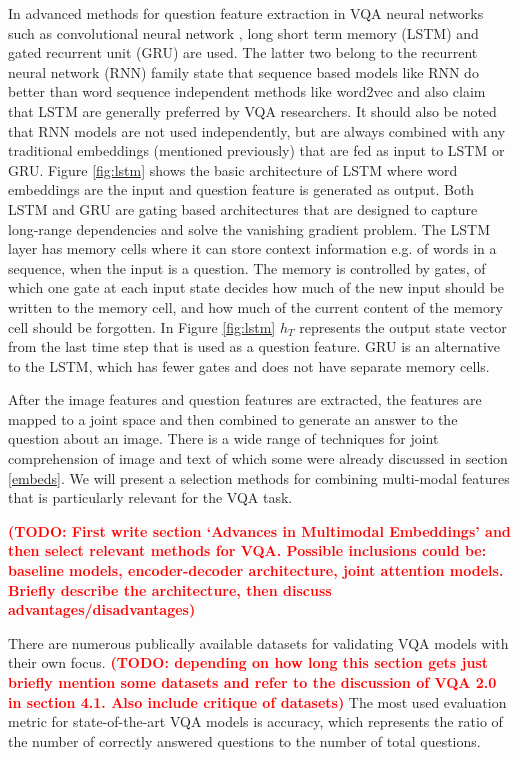 \documentclass{article}
\newcommand{\todo}[1]{\textbf{\textcolor{Red}{(TODO: #1)}}}
\begin{document}
In advanced methods for question feature extraction in VQA neural networks such as convolutional neural network \citep{krizhevsky2012imagenet}, long short term memory (LSTM) \citep{lstm} and gated recurrent unit (GRU) \citep{cho2014gru} are used. The latter two belong to the recurrent neural network (RNN) family \citep{elman1990finding} \cite{young2018recent} state that sequence based models like RNN do better than word sequence independent methods like word2vec and also claim that LSTM are generally preferred by VQA researchers. It should also be noted that RNN models are not used independently, but are always combined with any traditional embeddings (mentioned previously) that are fed as input to LSTM or GRU. Figure \ref{fig:lstm} shows the basic architecture of LSTM where word embeddings are the input and question feature is generated as output. Both LSTM and GRU are gating based architectures that are designed to capture long-range dependencies and solve the vanishing gradient problem. The LSTM layer has memory cells where it can store context information e.g. of words in a sequence, when the input is a question. The memory is controlled by gates, of which one gate at each input state decides how much of the new input should be written to the memory cell, and how much of the current content of the memory cell should be forgotten. In Figure \ref{fig:lstm} $h_T$ represents the output state vector from the last time step that is used as a question feature. GRU is an alternative to the LSTM, which has fewer gates and does not have separate memory cells.

After the image features and question features are extracted, the features are mapped to a joint space and then combined to generate an answer to the question about an image. There is a wide range of techniques for joint comprehension of image and text of which some were already discussed in section \ref{embeds}. We will present a selection methods for combining multi-modal features that is particularly relevant for the VQA task.

\todo{First write section ‘Advances in Multimodal Embeddings’ and then select relevant methods for VQA. Possible inclusions could be: baseline models, encoder-decoder architecture, joint attention models. Briefly describe the architecture, then discuss advantages/disadvantages}

There are numerous publically available datasets for validating VQA models with their own focus. \todo{depending on how long this section gets just briefly mention some datasets and refer to the discussion of VQA 2.0 in section 4.1. Also include critique of datasets}
The most used evaluation metric for state-of-the-art VQA models is accuracy, which represents the ratio of the number of correctly answered questions to the number of total questions. 
\end{document}
